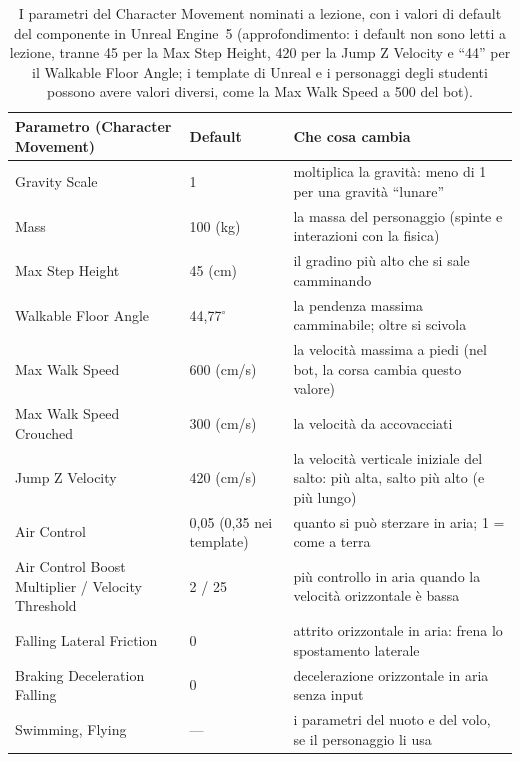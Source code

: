 \begin{table}[htbp]
\centering
\small
\begin{tabular}{@{}p{4.2cm}p{2.5cm}p{7.3cm}@{}}
\toprule
\textbf{Parametro (Character Movement)} & \textbf{Default} & \textbf{Che cosa cambia} \\
\midrule
Gravity Scale & 1 & moltiplica la gravità: meno di 1 per una gravità ``lunare'' \\
Mass & 100 (kg) & la massa del personaggio (spinte e interazioni con la fisica) \\
Max Step Height & 45 (cm) & il gradino più alto che si sale camminando \\
Walkable Floor Angle & 44,77$^\circ$ & la pendenza massima camminabile; oltre si scivola \\
Max Walk Speed & 600 (cm/s) & la velocità massima a piedi (nel bot, la corsa cambia
questo valore) \\
Max Walk Speed Crouched & 300 (cm/s) & la velocità da accovacciati \\
Jump Z Velocity & 420 (cm/s) & la velocità verticale iniziale del salto: più alta, salto
più alto (e più lungo) \\
Air Control & 0,05 (0,35 nei template) & quanto si può sterzare in aria; 1 = come a terra \\
Air Control Boost Multiplier / Velocity Threshold & 2 / 25 & più controllo in aria
quando la velocità orizzontale è bassa \\
Falling Lateral Friction & 0 & attrito orizzontale in aria: frena lo spostamento laterale \\
Braking Deceleration Falling & 0 & decelerazione orizzontale in aria senza input \\
Swimming, Flying & --- & i parametri del nuoto e del volo, se il personaggio li usa \\
\bottomrule
\end{tabular}
\caption{I parametri del Character Movement nominati a lezione, con i valori di default
del componente in Unreal Engine~5 (approfondimento: i default non sono letti a lezione,
tranne 45 per la Max Step Height, 420 per la Jump Z Velocity e ``44'' per il Walkable
Floor Angle; i template di Unreal e i personaggi degli studenti possono avere valori
diversi, come la Max Walk Speed a 500 del bot).}
\label{ue13:tab:cmc}
\end{table}

